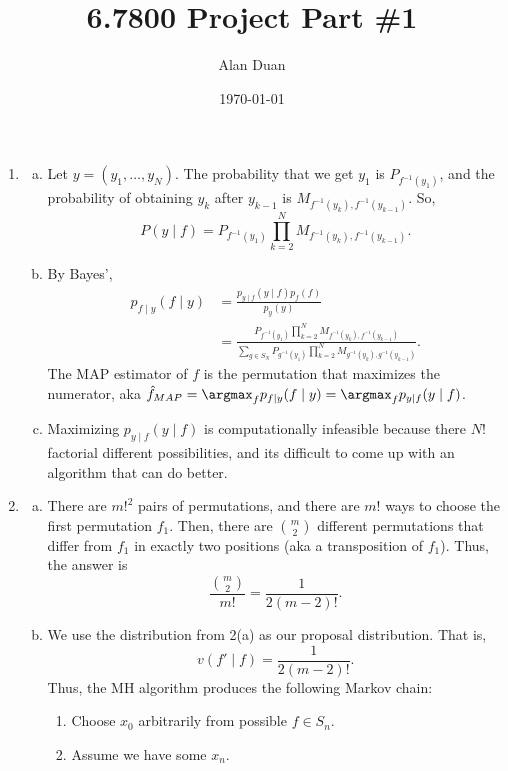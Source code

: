 \documentclass[12pt]{article}
\title{6.7800 Project Part \#1}
\author{Alan Duan}
\date{\today}
\begin{document}
\maketitle

\begin{enumerate}
\item \begin{enumerate}[(a)]
    \item Let $y=(y_1,\dotsc,y_N)$. The probability that we get $y_1$ is
        $P_{f^{-1}(y_1)}$, and the probability of obtaining $y_k$ after
        $y_{k-1}$ is $M_{f^{-1}(y_k),f^{-1}(y_{k-1})}$. So,
        \[P(y\mid
        f)=P_{f^{-1}(y_1)}\prod_{k=2}^NM_{f^{-1}(y_k),f^{-1}(y_{k-1})}.\]
    \item By Bayes',
        \begin{align*}
            p_{f\mid y}(f\mid y)&=\frac{p_{y\mid f}(y\mid f)p_f(f)}{p_y(y)}\\
            &=\frac{P_{f^{-1}(y_1)}\prod_{k=2}^NM_{f^{-1}(y_k),f^{-1}(y_{k-1})}}{\sum_{g\in
        S_N}P_{g^{-1}(y_1)}\prod_{k=2}^NM_{g^{-1}(y_k),g^{-1}(y_{k-1})}}.
        \end{align*}
        The MAP estimator of $f$ is the permutation that maximizes the
        numerator, aka $\hat f_{MAP}=\argmax_f p_{f\mid y}(f\mid y)=\argmax_f
        p_{y\mid f}(y\mid f)$.
    \item Maximizing $p_{y\mid f}(y\mid f)$ is computationally infeasible
        because there $N!$ factorial different possibilities, and its difficult
        to come up with an algorithm that can do better.
    \end{enumerate}
\newpage
\item
\begin{enumerate}[(a)]
    \item There are $m!^2$ pairs of permutations, and there are $m!$ ways to
        choose the first permutation $f_1$. Then, there are $\binom m2$ different
        permutations that differ from $f_1$ in exactly two positions (aka a
        transposition of $f_1$). Thus, the answer is
        \[\frac{\binom m2}{m!}=\frac{1}{2(m-2)!}.\]
    \item We use the distribution from 2(a) as our proposal distribution. That
        is, 
        \[v(f'\mid f)=\frac{1}{2(m-2)!}.\]
        Thus, the MH algorithm produces the following Markov chain:
        \begin{enumerate}
        \item Choose $x_0$ arbitrarily from possible $f\in S_n$.
        \item Assume we have some $x_n$.

\end{enumerate}
\end{enumerate}
\end{enumerate}
\end{document}

